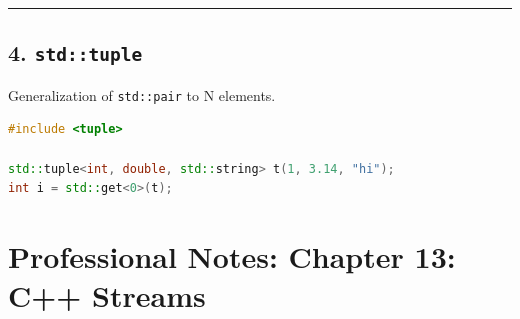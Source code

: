 \begin{center}\rule{0.5\linewidth}{0.5pt}\end{center}

\hypertarget{stdtuple}{%
\subsection{\texorpdfstring{4.
\texttt{std::tuple}}{4. std::tuple}}\label{stdtuple}}

Generalization of \passthrough{\lstinline!std::pair!} to N elements.

\begin{lstlisting}[language={C++}]
#include <tuple>

std::tuple<int, double, std::string> t(1, 3.14, "hi");
int i = std::get<0>(t);
\end{lstlisting}

\hypertarget{professional-notes-chapter-13-c-streams}{%
\section{Professional Notes: Chapter 13: C++
Streams}\label{professional-notes-chapter-13-c-streams}}


